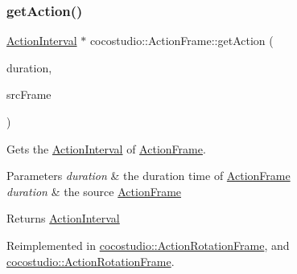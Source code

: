 \mbox{\label{classcocostudio_1_1ActionFrame_aad2a9c2314821270f5961416f4d7fb18}} 
\subsubsection{\texorpdfstring{get\+Action()}{getAction()}\hspace{0.1cm}{\footnotesize\ttfamily [3/4]}}
{\footnotesize\ttfamily \hyperlink{classActionInterval}{Action\+Interval} $\ast$ cocostudio\+::\+Action\+Frame\+::get\+Action (\begin{DoxyParamCaption}\item[{float}]{duration,  }\item[{\hyperlink{classcocostudio_1_1ActionFrame}{Action\+Frame} $\ast$}]{src\+Frame }\end{DoxyParamCaption})\hspace{0.3cm}{\ttfamily [virtual]}}

Gets the \hyperlink{classActionInterval}{Action\+Interval} of \hyperlink{classcocostudio_1_1ActionFrame}{Action\+Frame}.


\begin{DoxyParams}{Parameters}
{\em duration} & the duration time of \hyperlink{classcocostudio_1_1ActionFrame}{Action\+Frame}\\
\hline
{\em duration} & the source \hyperlink{classcocostudio_1_1ActionFrame}{Action\+Frame}\\
\hline
\end{DoxyParams}
\begin{DoxyReturn}{Returns}
\hyperlink{classActionInterval}{Action\+Interval} 
\end{DoxyReturn}


Reimplemented in \hyperlink{classcocostudio_1_1ActionRotationFrame_ab713e9ea4332bb5cea201b7f6dc424fc}{cocostudio\+::\+Action\+Rotation\+Frame}, and \hyperlink{classcocostudio_1_1ActionRotationFrame_adb56d8ed3cc97f590cba9429602ef918}{cocostudio\+::\+Action\+Rotation\+Frame}.

\mbox{\label{classcocostudio_1_1ActionFrame_ac31860becfcfe2d19331a51197ee79bd}} 
